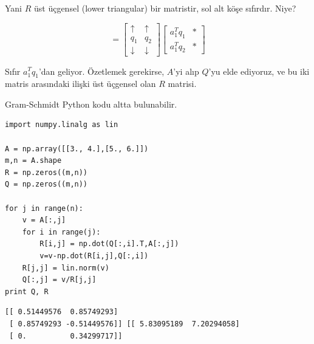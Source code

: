 \documentclass[12pt,fleqn]{article}\usepackage{../../common}
\begin{document}
Yani $R$ üst üçgensel (lower triangular) bir matristir, sol alt köşe
sıfırdır. Niye? 

$$
= \left[
\begin{array}{rrr}
\uparrow &  \uparrow \\
q_1 &  q_2 \\
\downarrow &  \downarrow 
\end{array}\right]
\left[\begin{array}{rrr}
a_1^Tq_1 &  * \\
a_1^Tq_2 &  *
\end{array}
\right]
$$

Sıfır $a_1^Tq_1$'dan geliyor. Özetlemek gerekirse, $A$'yi alıp $Q$'yu elde
ediyoruz, ve bu iki matris arasındaki ilişki üst üçgensel olan $R$
matrisi. 

Gram-Schmidt Python kodu altta bulunabilir.

\begin{verbatim}
import numpy.linalg as lin

A = np.array([[3., 4.],[5., 6.]])
m,n = A.shape
R = np.zeros((m,n))
Q = np.zeros((m,n))

for j in range(n):
    v = A[:,j]
    for i in range(j):
        R[i,j] = np.dot(Q[:,i].T,A[:,j])
        v=v-np.dot(R[i,j],Q[:,i])
    R[j,j] = lin.norm(v)
    Q[:,j] = v/R[j,j]
print Q, R
\end{verbatim}

\begin{verbatim}
[[ 0.51449576  0.85749293]
 [ 0.85749293 -0.51449576]] [[ 5.83095189  7.20294058]
 [ 0.          0.34299717]]
\end{verbatim}
\end{document}
